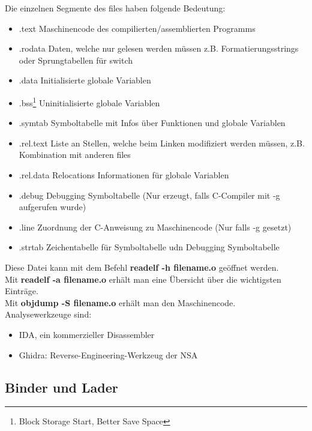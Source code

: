 \documentclass[a4paper,12pt,leqno]{article}
\begin{document}
Die einzelnen Segmente des files haben folgende Bedeutung:
\begin{itemize}
\item .text Maschinencode des compilierten/assemblierten Programms
\item .rodata Daten, welche nur gelesen werden müssen z.B. Formatierungsstrings oder Sprungtabellen für switch
\item .data Initialisierte globale Variablen
\item .bss\footnote{Block Storage Start, Better Save Space} Uninitialisierte globale Variablen
\item .symtab Symboltabelle mit Infos über Funktionen und globale Variablen
\item .rel.text Liste an Stellen, welche beim Linken modifiziert werden müssen, z.B. Kombination mit anderen files
\item .rel.data Relocations Informationen für globale Variablen
\item .debug Debugging Symboltabelle (Nur erzeugt, falls C-Compiler mit -g aufgerufen wurde)
\item .line Zuordnung der C-Anweisung zu Maschinencode (Nur falls -g gesetzt)
\item .strtab Zeichentabelle für Symboltabelle udn Debugging Symboltabelle
\end{itemize}

Diese Datei kann mit dem Befehl \textbf{readelf -h filename.o} geöffnet werden.\\
Mit \textbf{readelf -a filename.o} erhält man eine Übersicht über die wichtigsten Einträge.\\
Mit \textbf{objdump -S filename.o} erhält man den Maschinencode.\\

Analysewerkzeuge sind:
\begin{itemize}
\item IDA, ein kommerzieller Disassembler
\item Ghidra: Reverse-Engineering-Werkzeug der NSA
\end{itemize}

\subsection{Binder und Lader}
\end{document}
